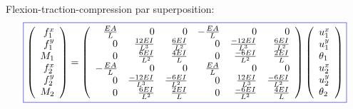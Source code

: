 \documentclass[a4paper]{article}
\newcommand{\myredbox}[1]{\fcolorbox{blue}{white}{$\displaystyle#1$}}
\begin{document}
Flexion-traction-compression par superposition:
\[\myredbox{\left(\begin{array}{r} 
f_{1}^x\\f_{1}^y\\M_1\\f_{2}^x\\f_{2}^y\\M_2
\end{array}\right)=\left(\begin{array}{rrrrrr} 
\frac{EA}{L}&0&0&-\frac{EA}{L}&0&0\\
0&\frac{12EI}{L^3}&\frac{6EI}{L^2}&0&\frac{-12EI}{L^3}&\frac{6EI}{L^2}\\
0&\frac{6EI}{L^2}&\frac{4EI}{L}&0&\frac{-6EI}{L^2}&\frac{2EI}{L}\\
-\frac{EA}{L}&0&0&\frac{EA}{L}&0&0\\
0&\frac{-12EI}{L^3}&\frac{-6EI}{L^2}&0&\frac{12EI}{L^3}&\frac{-6EI}{L^2}\\
0&\frac{6EI}{L^2}&\frac{2EI}{L}&0&\frac{-6EI}{L^2}&\frac{4EI}{L}
\end{array}\right) \left(\begin{array}{l} 
u_{1}^x\\u_{1}^y\\\theta_1\\u_{2}^x\\u_{2}^y\\\theta_2
\end{array}\right)} 
\]
\end{document}
